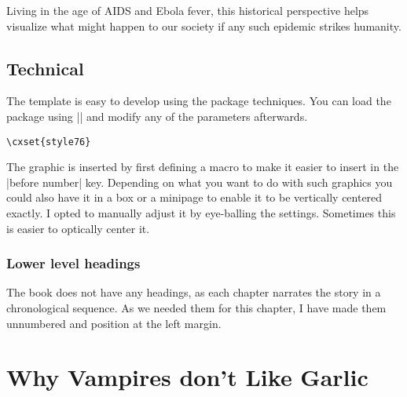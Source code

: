 Living in the age of AIDS and Ebola fever, this historical perspective helps visualize what might happen to our society if any such epidemic strikes humanity.

\section{Technical}

The template is easy to develop using the  package techniques. You can load the package using
|\cxsetstyle| and modify any of the parameters afterwards.

\begin{verbatim}
\cxset{style76}
\end{verbatim}

The graphic is inserted by first defining a macro to make it easier to insert in the |before number| key. Depending on what you want to do with such graphics you could also have it in a box or a minipage to enable it to be vertically centered exactly. I opted to manually adjust it by eye-balling the settings. Sometimes this is easier to    optically center it. 

\subsection{Lower level headings}

The book does not have any headings, as each chapter narrates the story in a chronological sequence. As we needed them for this chapter, I have made them unnumbered and position at the left margin.





\chapter{Why Vampires don’t Like Garlic}


\makeatother




